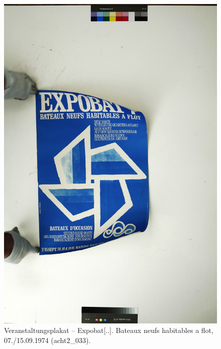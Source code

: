 \documentclass[a4paper,12pt,ngerman]{article}
\begin{document}
\newpage
\begin{figure}[ht]
\includegraphics[width=\linewidth]{Abbildung_51_(acht2_033)}
\centering
\caption{Veranstaltungsplakat -- Expobat[..]. Bateaux neufs habitables a flot, 07./15.09.1974 (acht2\_033).}
\end{figure}
\end{document}
